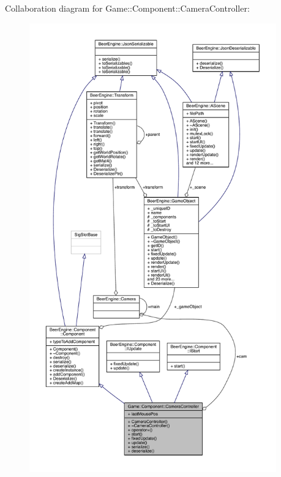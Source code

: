 Collaboration diagram for Game\+:\+:Component\+:\+:Camera\+Controller\+:
\nopagebreak
\begin{figure}[H]
\begin{center}
\leavevmode
\includegraphics[height=550pt]{class_game_1_1_component_1_1_camera_controller__coll__graph}
\end{center}
\end{figure}
